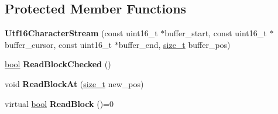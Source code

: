 \subsection*{Protected Member Functions}
\begin{DoxyCompactItemize}
\item 
\mbox{\label{classv8_1_1internal_1_1Utf16CharacterStream_a860aafa22a7858f33c04b96c1041ee76}} 
{\bfseries Utf16\+Character\+Stream} (const uint16\+\_\+t $\ast$buffer\+\_\+start, const uint16\+\_\+t $\ast$buffer\+\_\+cursor, const uint16\+\_\+t $\ast$buffer\+\_\+end, \mbox{\hyperlink{classsize__t}{size\+\_\+t}} buffer\+\_\+pos)
\item 
\mbox{\label{classv8_1_1internal_1_1Utf16CharacterStream_aa06a0877cfd090955722e22fc1d08c5f}} 
\mbox{\hyperlink{classbool}{bool}} {\bfseries Read\+Block\+Checked} ()
\item 
\mbox{\label{classv8_1_1internal_1_1Utf16CharacterStream_ab8cd17e3a68071c51810852e2267a2f2}} 
void {\bfseries Read\+Block\+At} (\mbox{\hyperlink{classsize__t}{size\+\_\+t}} new\+\_\+pos)
\item 
\mbox{\label{classv8_1_1internal_1_1Utf16CharacterStream_a1b78e988d057208df027c0c83431d590}} 
virtual \mbox{\hyperlink{classbool}{bool}} {\bfseries Read\+Block} ()=0
\end{DoxyCompactItemize}

